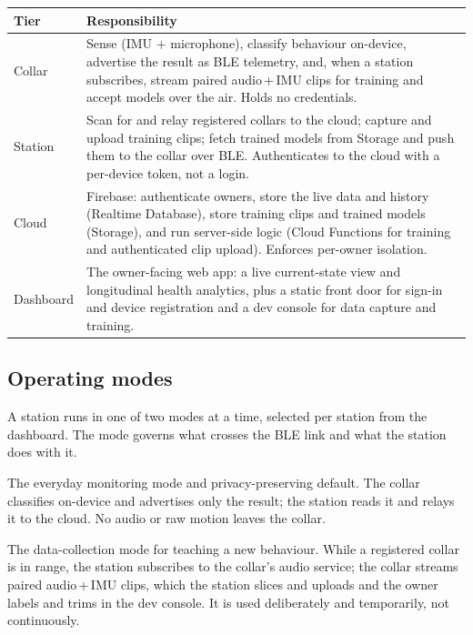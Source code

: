 \begin{center}
  \label{tab:responsibilities}
  \begin{tabularx}{\textwidth}{@{}lX@{}}
    \toprule
    \textbf{Tier} & \textbf{Responsibility} \\
    \midrule
    Collar    & Sense (IMU + microphone), classify behaviour on-device, advertise the result as BLE
                telemetry, and, when a station subscribes, stream paired audio\,+\,IMU clips for
                training and accept models over the air. Holds no credentials. \\
    Station   & Scan for and relay registered collars to the cloud; capture and upload training
                clips; fetch trained models from Storage and push them to the collar over BLE.
                Authenticates to the cloud with a per-device token, not a login. \\
    Cloud     & Firebase: authenticate owners, store the live data and history (Realtime Database),
                store training clips and trained models (Storage), and run server-side logic (Cloud
                Functions for training and authenticated clip upload). Enforces per-owner isolation. \\
    Dashboard & The owner-facing web app: a live current-state view and longitudinal health
                analytics, plus a static front door for sign-in and device registration and a
                dev console for data capture and training. \\
    \bottomrule
  \end{tabularx}
\end{center}

\subsection{Operating modes}

A station runs in one of two modes at a time, selected per station from the dashboard. The mode
governs what crosses the BLE link and what the station does with it.

\begin{description}[leftmargin=1.6em,style=nextline]
  \item[Production mode] The everyday monitoring mode and privacy-preserving default. The collar
        classifies on-device and advertises only the result; the station reads it and relays it to
        the cloud. No audio or raw motion leaves the collar.
  \item[Training mode] The data-collection mode for teaching a new behaviour. While a registered
        collar is in range, the station subscribes to the collar's audio service; the collar streams
        paired audio\,+\,IMU clips, which the station slices and uploads and the owner labels and
        trims in the dev console. It is used deliberately and temporarily, not continuously.
\end{description}

